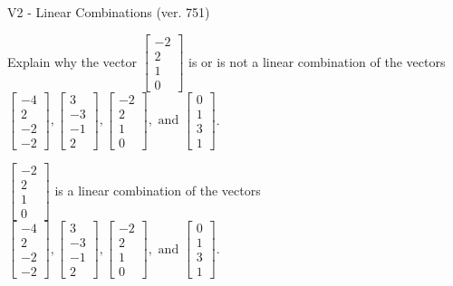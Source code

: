 \begin{exercise}
  \begin{exerciseTitle}V2 - Linear Combinations (ver. 751)\end{exerciseTitle}
  \begin{exerciseStatement}
    Explain why the vector \(\left[\begin{array}{c}
-2 \\
2 \\
1 \\
0
\end{array}\right]\)  is or is not a linear 
	combination of the vectors \(\left[\begin{array}{c}
-4 \\
2 \\
-2 \\
-2
\end{array}\right] , \left[\begin{array}{c}
3 \\
-3 \\
-1 \\
2
\end{array}\right] , \left[\begin{array}{c}
-2 \\
2 \\
1 \\
0
\end{array}\right] , \text{ and } \left[\begin{array}{c}
0 \\
1 \\
3 \\
1
\end{array}\right]\).
	


  \end{exerciseStatement}
  \begin{exerciseAnswer}
   \(\left[\begin{array}{c}
-2 \\
2 \\
1 \\
0
\end{array}\right]\) 
  	 is  
	a linear combination of the vectors \(\left[\begin{array}{c}
-4 \\
2 \\
-2 \\
-2
\end{array}\right] , \left[\begin{array}{c}
3 \\
-3 \\
-1 \\
2
\end{array}\right] , \left[\begin{array}{c}
-2 \\
2 \\
1 \\
0
\end{array}\right] , \text{ and } \left[\begin{array}{c}
0 \\
1 \\
3 \\
1
\end{array}\right]\).


\end{exerciseAnswer}
\end{exercise}
